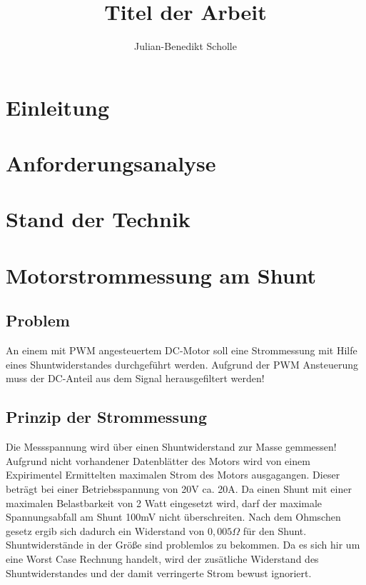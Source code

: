 \documentclass[11pt,twoside,openright]{mpreport}
\title{Titel der Arbeit}
\author{Julian-Benedikt Scholle}
\begin{document}
\maketitle
\tableofcontents

\chapter{Einleitung}

\chapter{Anforderungsanalyse}

\chapter{Stand der Technik}

\chapter{Motorstrommessung am Shunt}


\section{Problem}

An einem mit PWM angesteuertem DC-Motor soll eine Strommessung mit Hilfe eines Shuntwiderstandes
durchgeführt werden. Aufgrund der PWM Ansteuerung muss der DC-Anteil aus dem Signal herausgefiltert werden!


\section{Prinzip der Strommessung}

Die Messspannung wird über einen Shuntwiderstand zur Masse gemmessen! Aufgrund nicht vorhandener Datenblätter des Motors
wird von einem Expirimentel Ermittelten maximalen Strom des Motors ausgagangen. Dieser beträgt bei einer Betriebsspannung von 20V ca. 20A.
Da einen Shunt mit einer maximalen Belastbarkeit von 2 Watt eingesetzt wird, darf der maximale Spannungsabfall am Shunt 100mV nicht überschreiten.
Nach dem Ohmschen gesetz ergib sich dadurch ein Widerstand von $0,005 \Omega$  für den Shunt. Shuntwiderstände in der Größe sind problemlos zu bekommen.
Da es sich hir um eine Worst Case Rechnung handelt, wird der zusätliche Widerstand des Shuntwiderstandes und der damit verringerte Strom bewust ignoriert.
\end{document}
